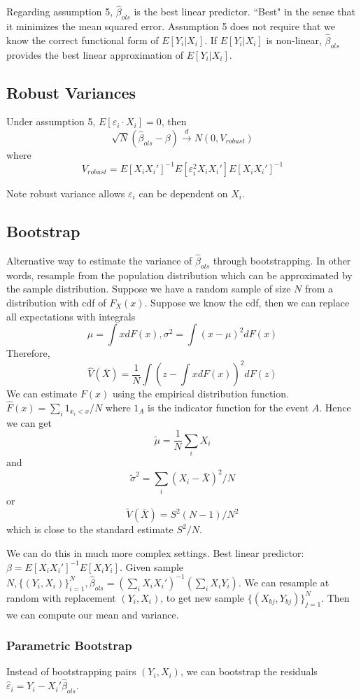 \documentclass[11pt, a4paper, oneside]{article}
\theoremstyle{definition}
\theoremstyle{proposition}
\theoremstyle{corollary}
\theoremstyle{lemma}
\theoremstyle{theorem}
\begin{document}
Regarding assumption 5, $\hat{\beta}_{ols}$ is the best linear predictor. ``Best" in the sense that it minimizes the mean squared error. Assumption 5 does not require that we know the correct functional form of $E[Y_i|X_i]$. If $E[Y_i|X_i]$ is non-linear, $\hat{\beta}_{ols}$ provides the best linear approximation of $E[Y_i|X_i]$. 

\subsection{Robust Variances}
Under assumption 5, $E[\varepsilon_i\cdot X_i] = 0$, then $$\sqrt{N}(\hat{\beta}_{ols} - \beta)\overset{d}{\to} N(0, V_{robust})$$
where $$V_{robust} = E[X_iX_i']^{-1}E[\varepsilon_i^2X_iX_i']E[X_iX_i']^{-1}$$

Note robust variance allows $\varepsilon_i$ can be dependent on $X_i$. 

\subsection{Bootstrap}
Alternative way to estimate the variance of $\hat{\beta}_{ols}$ through bootstrapping. In other words, resample from the population distribution which can be approximated by the sample distribution. Suppose we have a random sample of size $N$ from a distribution with cdf of $F_X(x)$. Suppose we know the cdf, then we can replace all expectations with integrals
$$\mu = \int xdF(x), \sigma^2 = \int(x-\mu)^2dF(x)$$ 
Therefore, $$\hat{V}(\bar{X})  = \frac{1}{N}\int (z - \int x dF(x))^2dF(z)$$
We can estimate $F(x)$ using the empirical distribution function. $\hat{F}(x) = \sum_i 1_{x_i < x} / N$ where $1_A$ is the indicator function for the event $A$. Hence we can get
$$\tilde{\mu} = \frac{1}{N}\sum_i X_i$$ and
$$\tilde{\sigma}^2 = \sum_i (X_i - \bar{X})^2/N$$
or $$\tilde{V}(\bar{X}) = S^2(N-1)/N^2$$ which is close to the standard estimate $S^2/N$. 

We can do this in much more complex settings. Best linear predictor: $\beta = E[X_iX_i']^{-1}E[X_iY_i]$. Given sample $N, \{(Y_i, X_i)\}^{N}_{i=1}, \hat{\beta}_{ols} = (\sum_i X_iX_i')^{-1}(\sum_i X_iY_i)$. We can resample at random with replacement $(Y_i, X_i)$, to get new sample $\{(X_{bj}, Y_{bj})\}^N_{j=1}$. Then we can compute our mean and variance. 

\subsubsection{Parametric Bootstrap}
Instead of bootstrapping pairs $(Y_i, X_i)$, we can bootstrap the residuals $\hat{\varepsilon}_i = Y_i - X_i'\hat{\beta}_{ols}$. 
\end{document}

